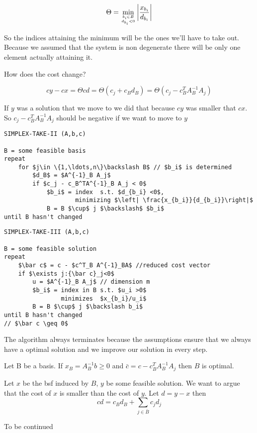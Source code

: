 \[\Theta = \min_{{b_i\in B}\atop {d_{b_i} <0}} \left| \frac{x_{b_i}}{d_{b_i}}\right |\]

So the indices attaining the minimum will be the ones we'll have to take out. Because we assumed that the system is non degenerate there will be only one element actually attaining it. %

How does the cost change?

\[cy -cx = \Theta cd = \Theta(c_j+c_Bd_B) = \Theta(c_j - c_B^TA^{-1}_B A_j)\]

If $y$ was a solution that we move to we did that because $cy$ was smaller that $cx$. So $c_j - c_B^TA^{-1}_B A_j$ should be negative if we want to move to $y$

\begin{lstlisting}
SIMPLEX-TAKE-II (A,b,c)

B = some feasible basis
repeat 
    for $j\in \{1,\ldots,n\}\backslash B$ // $b_i$ is determined
        $d_B$ = $A^{-1}_B A_j$
        if $c_j - c_B^TA^{-1}_B A_j < 0$
            $b_i$ = index  s.t. $d_{b_i} <0$, 
                    minimizing $\left| \frac{x_{b_i}}{d_{b_i}}\right|$
            B = B $\cup$ j $\backslash$ $b_i$
until B hasn't changed
\end{lstlisting}


\begin{lstlisting}
SIMPLEX-TAKE-III (A,b,c)

B = some feasible solution
repeat
    $\bar c$ = c - $c^T_B A^{-1}_BA$ //reduced cost vector
    if $\exists j:{\bar c}_j<0$ 
        u = $A^{-1}_B A_j$ // dimension m
        $b_i$ = index in B s.t. $u_i >0$ 
                minimizes  $x_{b_i}/u_i$
        B = B $\cup$ j $\backslash b_i$ 
until B hasn't changed 
// $\bar c \geq 0$ 
\end{lstlisting}

The algorithm always terminates because the assumptions ensure that we always have a optimal solution and we improve our solution in every step.

\begin{thm}\label{Pr:simplexIIIopt} Let B be a basis. If $x_B=A^{-1}_Bb\geq 0$ and $\bar c=c-c_B^{T}A_B^{-1}A_j$ then $B$ is optimal.\end{thm}

\begin{pr} Let $x$ be the bsf induced by $B$, $y$ be some feasible solution. We want to argue that the cost of $x$ is smaller than the cost of $y$. Let $d=y-x$ then 
\[cd = c_Bd_B + \sum_{j\in \bar B} c_jd_j \] 

To be continued
\end{pr}